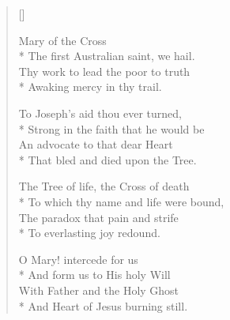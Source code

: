 
\newHymn
\label{hymn:OMotherMary}

\begin{verse}[\versewidth]

 Mary of the Cross\\*
The first Australian saint, we hail.\\
Thy work to lead the poor to truth\\*
Awaking mercy in thy trail.







To Joseph's aid thou ever turned,\\*
Strong in the faith that he would be\\
An advocate to that dear Heart\\*
That bled and died upon the Tree.

The Tree of life, the Cross of death\\*
To which thy name and life were bound,\\
The paradox that pain and strife\\*
To everlasting joy redound.

O Mary! intercede for us\\*
And form us to His holy Will\\
With Father and the Holy Ghost\\*
And Heart of Jesus burning still.

\end{verse}


